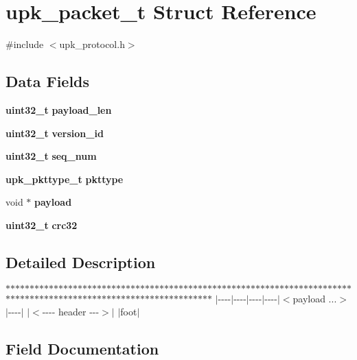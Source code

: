 \section{upk\_\-packet\_\-t Struct Reference}
\label{structupk__packet__t}


{\ttfamily \#include $<$upk\_\-protocol.h$>$}

\subsection*{Data Fields}
\begin{DoxyCompactItemize}
\item 
{\bf uint32\_\-t} {\bf payload\_\-len}
\item 
{\bf uint32\_\-t} {\bf version\_\-id}
\item 
{\bf uint32\_\-t} {\bf seq\_\-num}
\item 
{\bf upk\_\-pkttype\_\-t} {\bf pkttype}
\item 
void $\ast$ {\bf payload}
\item 
{\bf uint32\_\-t} {\bf crc32}
\end{DoxyCompactItemize}


\subsection{Detailed Description}
$\ast$$\ast$$\ast$$\ast$$\ast$$\ast$$\ast$$\ast$$\ast$$\ast$$\ast$$\ast$$\ast$$\ast$$\ast$$\ast$$\ast$$\ast$$\ast$$\ast$$\ast$$\ast$$\ast$$\ast$$\ast$$\ast$$\ast$$\ast$$\ast$$\ast$$\ast$$\ast$$\ast$$\ast$$\ast$$\ast$$\ast$$\ast$$\ast$$\ast$$\ast$$\ast$$\ast$$\ast$$\ast$$\ast$$\ast$$\ast$$\ast$$\ast$$\ast$$\ast$$\ast$$\ast$$\ast$$\ast$$\ast$$\ast$$\ast$$\ast$$\ast$$\ast$$\ast$$\ast$$\ast$$\ast$$\ast$$\ast$$\ast$$\ast$$\ast$$\ast$$\ast$$\ast$$\ast$$\ast$$\ast$$\ast$$\ast$$\ast$$\ast$$\ast$$\ast$$\ast$$\ast$$\ast$$\ast$$\ast$$\ast$$\ast$$\ast$$\ast$$\ast$$\ast$$\ast$$\ast$$\ast$$\ast$$\ast$$\ast$$\ast$$\ast$$\ast$$\ast$$\ast$$\ast$$\ast$$\ast$$\ast$$\ast$$\ast$$\ast$$\ast$$\ast$$\ast$ $|$-\/-\/-\/-\/$|$-\/-\/-\/-\/$|$-\/-\/-\/-\/$|$-\/-\/-\/-\/$|$$<$payload ...$>$$|$-\/-\/-\/-\/$|$ $|$$<$-\/-\/-\/-\/ header -\/-\/-\/$>$$|$ $|$foot$|$ 

\subsection{Field Documentation}
